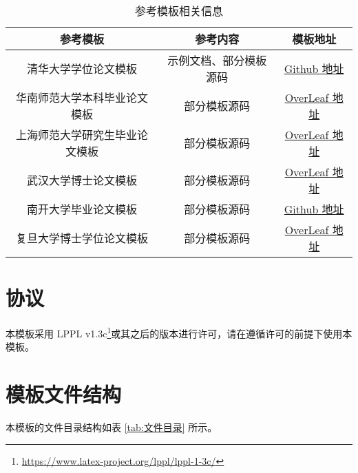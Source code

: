 \documentclass[report, twoside, UTF8, AutoFakeBold = 1, AutoFakeSlant, zihao = -4]{config}
\begin{document}
\begin{table}
    \centering
    \renewcommand{\arraystretch}{1.2} %
    \setlength{\tabcolsep}{3pt} %
    \caption{参考模板相关信息}
    \label{tab:templates}
    \begin{threeparttable}[c]
        \begin{tabular}{ccc}
            \toprule[1.5pt]
            \textbf{参考模板}    &  \textbf{参考内容}    & \textbf{模板地址}\\
            \midrule[0.8pt]
            清华大学学位论文模板 & 示例文档、部分模板源码 & \href{https://github.com/tuna/thuthesis}{Github 地址}\\
            华南师范大学本科毕业论文模板 & 部分模板源码 & \href{https://www.overleaf.com/latex/templates/scnu-my-article/jkbbvhnddtsw}{OverLeaf 地址}\\
            上海师范大学研究生毕业论文模板 & 部分模板源码 & \href{https://www.overleaf.com/latex/templates/shnu-thesis/wsykzrksspgn}{OverLeaf 地址}\\
            武汉大学博士论文模板 & 部分模板源码 & \href{https://www.overleaf.com/latex/templates/wu-yi-da-xue-bo-shi-lun-wen-latex-mo-ban/rcdzgvqgkddk}{OverLeaf 地址}\\
            南开大学毕业论文模板 & 部分模板源码 & \href{https://github.com/Tr0py/NKU-thesis-template-2020}{Github 地址}\\
            复旦大学博士学位论文模板 & 部分模板源码 & \href{https://cn.overleaf.com/latex/templates/fduthesis-latex-thesis-template-for-fudan-university/svtdhhstkmkt}{OverLeaf 地址}\\
            \bottomrule[1.5pt]
        \end{tabular}
    \end{threeparttable}
\end{table}

\section{协议}

本模板采用 LPPL v1.3c\footnote{\url{https://www.latex-project.org/lppl/lppl-1-3c/}}或其之后的版本进行许可，请在遵循许可的前提下使用本模板。

\section{模板文件结构}

本模板的文件目录结构如表 \ref{tab:文件目录} 所示。
\end{document}
